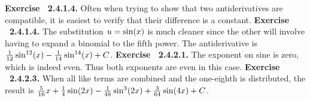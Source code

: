  {\noindent \protect \bf  Exercise ~2.4.1.4.} Often when trying to show that two antiderivatives are compatible, it is easiest to verify that their difference is a constant.  \protect \newline  \protect \newline  
 {\noindent \protect \bf  Exercise ~2.4.1.4.} The substitution $u=\protect \qopname  \relax o{sin}(x)$ is much cleaner since the other will involve having to expand a binomial to the fifth power. The antiderivative is $\protect \frac  {1}{12}\protect \qopname  \relax o{sin}^{12}(x)-\protect \frac  {1}{14}\protect \qopname  \relax o{sin}^{14}(x)+C$. \protect \newline  \protect \newline  
 {\noindent \protect \bf  Exercise ~2.4.2.1.} The exponent on sine is zero, which is indeed even. Thus both exponents are even in this case. \protect \newline  \protect \newline  
 {\noindent \protect \bf  Exercise ~2.4.2.3.} When all like terms are combined and the one-eighth is distributed, the result is $\protect \frac  {5}{16}x+\protect \frac  {1}{4}\protect \qopname  \relax o{sin}(2x)-\protect \frac  {1}{48}\protect \qopname  \relax o{sin}^3(2x)+\protect \frac  {3}{64}\protect \qopname  \relax o{sin}(4x)+C$. \protect \newline  \protect \newline  
